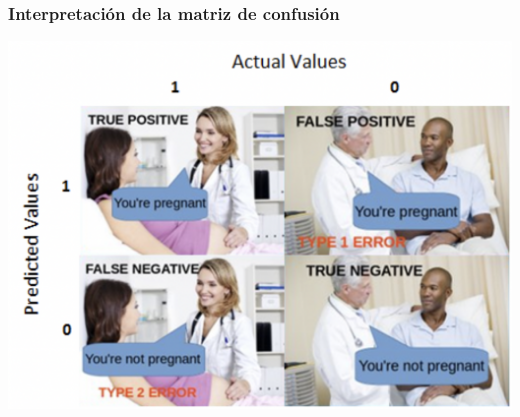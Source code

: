 \documentclass[
10pt, %
aspectratio=169, %
]{beamer}
\begin{document}
	\begin{frame}
		
		\frametitle{Interpretación de la matriz de confusión}
		
		\centering
		\includegraphics[scale=0.35]{m2.png}
		
	\end{frame}
	
\end{document}
